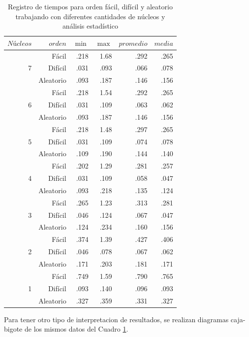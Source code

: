 \documentclass[a4paper, 11pt]{article}
\begin{document}
    \begin{table}[H]
        \caption{Registro de tiempos para orden fácil, difícil y aleatorio trabajando con diferentes cantidades de núcleos y análisis estadístico}
        \bigskip
        \label{tab1}
        \centering
        \begin{tabular}{|r|r|r|r|r|r|}
        \hline
        $Núcleos$&$orden$&$\min$&$\max$&$promedio$&$media$ \\
        \hline
         &Fácil & .218 & 1.68 & .292 & .265 \\
        7&Difícil & .031 & .093 & .066 & .078 \\
         &Aleatorio & .093 & .187 & .146 & .156 \\
        \hline
        &Fácil & .218 & 1.54 & .292 & .265 \\
        6&Difícil & .031 & .109 & .063 & .062 \\
         &Aleatorio & .093 & .187 & .146 & .156 \\
        \hline
         &Fácil & .218 & 1.48 & .297 & .265 \\
        5&Difícil & .031 & .109 & .074 & .078 \\
         &Aleatorio & .109 & .190 & .144 & .140 \\ 
        \hline
         &Fácil & .202 & 1.29 & .281 & .257 \\
        4&Difícil & .031 & .109 & .058 & .047 \\
         &Aleatorio & .093 & .218 & .135 & .124 \\
        \hline
         &Fácil & .265 & 1.23 & .313 & .281 \\
        3&Difícil & .046 & .124 & .067 & .047 \\
         &Aleatorio & .124 & .234 & .160 & .156 \\
        \hline
         &Fácil & .374 & 1.39 & .427 & .406 \\
        2&Difícil & .046 & .078 & .067 & .062 \\
         &Aleatorio & .171 & .203 & .181 & .171 \\
        \hline
         &Fácil & .749 & 1.59 & .790 & .765 \\
        1&Difícil & .093 & .140 & .096 & .093 \\
         &Aleatorio & .327 & .359 & .331 & .327 \\
         \hline
        \end{tabular}
    \end{table}
Para tener otro tipo de interpretacion de resultados, se realizan diagramas caja-bigote de los mismos datos del Cuadro \ref{tab1}.
    
\end{document}

